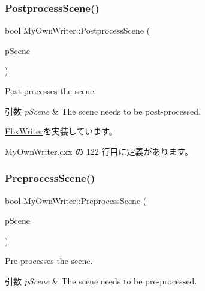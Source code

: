 \mbox{\label{class_my_own_writer_ae115fe8a21568ef1cd2a465a15d79e80}} 
\subsubsection{\texorpdfstring{Postprocess\+Scene()}{PostprocessScene()}}
{\footnotesize\ttfamily bool My\+Own\+Writer\+::\+Postprocess\+Scene (\begin{DoxyParamCaption}\item[{\hyperlink{class_fbx_scene}{Fbx\+Scene} \&}]{p\+Scene }\end{DoxyParamCaption})\hspace{0.3cm}{\ttfamily [virtual]}}

Post-\/processes the scene. 
\begin{DoxyParams}{引数}
{\em p\+Scene} & The scene needs to be post-\/processed. \\
\hline
\end{DoxyParams}


\hyperlink{class_fbx_writer_a1cfdf59f72ebe777484862e4b64b5d65}{Fbx\+Writer}を実装しています。



 My\+Own\+Writer.\+cxx の 122 行目に定義があります。

\mbox{\label{class_my_own_writer_abd6b665986bf496ed56cc07ca1f30a21}} 
\subsubsection{\texorpdfstring{Preprocess\+Scene()}{PreprocessScene()}}
{\footnotesize\ttfamily bool My\+Own\+Writer\+::\+Preprocess\+Scene (\begin{DoxyParamCaption}\item[{\hyperlink{class_fbx_scene}{Fbx\+Scene} \&}]{p\+Scene }\end{DoxyParamCaption})\hspace{0.3cm}{\ttfamily [virtual]}}

Pre-\/processes the scene. 
\begin{DoxyParams}{引数}
{\em p\+Scene} & The scene needs to be pre-\/processed. \\
\hline
\end{DoxyParams}



